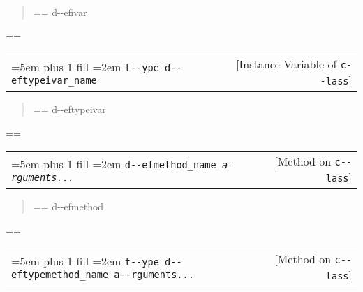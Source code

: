 \documentclass{book}
\makeatletter
\newenvironment{GNUTexinfopreformatted}{%
  \par\GNUTobeylines\obeyspaces\frenchspacing
  \parskip=\z@\parindent=\z@}{}
{\catcode`\^^M=13 \gdef\GNUTobeylines{\catcode`\^^M=13 \def^^M{\null\par}}}
\newenvironment{GNUTexinfoindented}
  {\begin{list}{}{}
  \item\relax}
  {\end{list}}
\makeatother
\begin{document}
\begin{GNUTexinfoindented}
%
\begin{quote}
\unskip{\parskip=0pt\noindent}%
\begin{GNUTexinfopreformatted}%
\ttfamily d{-}{-}efivar
\end{GNUTexinfopreformatted}
\end{quote}
\begin{GNUTexinfopreformatted}%
\ttfamily 
\end{GNUTexinfopreformatted}

\noindent\begin{tabularx}{\linewidth}{@{}Xr}
\rightskip=5em plus 1 fill
\hangindent=2em
\texttt{t{-}{-}ype d{-}{-}eftypeivar\_name}& [Instance Variable of \texttt{c{-}{-}lass}]
\end{tabularx}

%
\begin{quote}
\unskip{\parskip=0pt\noindent}%
\begin{GNUTexinfopreformatted}%
\ttfamily d{-}{-}eftypeivar
\end{GNUTexinfopreformatted}
\end{quote}
\begin{GNUTexinfopreformatted}%
\ttfamily 
\end{GNUTexinfopreformatted}

\noindent\begin{tabularx}{\linewidth}{@{}Xr}
\rightskip=5em plus 1 fill
\hangindent=2em
\texttt{d{-}{-}efmethod\_name \EmbracOn{}\textnormal{\textsl{a--rguments...}}\EmbracOff{}}& [Method on \texttt{c{-}{-}lass}]
\end{tabularx}

%
\begin{quote}
\unskip{\parskip=0pt\noindent}%
\begin{GNUTexinfopreformatted}%
\ttfamily d{-}{-}efmethod
\end{GNUTexinfopreformatted}
\end{quote}
\begin{GNUTexinfopreformatted}%
\ttfamily 
\end{GNUTexinfopreformatted}

\noindent\begin{tabularx}{\linewidth}{@{}Xr}
\rightskip=5em plus 1 fill
\hangindent=2em
\texttt{t{-}{-}ype d{-}{-}eftypemethod\_name a{-}{-}rguments...}& [Method on \texttt{c{-}{-}lass}]
\end{tabularx}


\end{GNUTexinfoindented}
\end{document}
